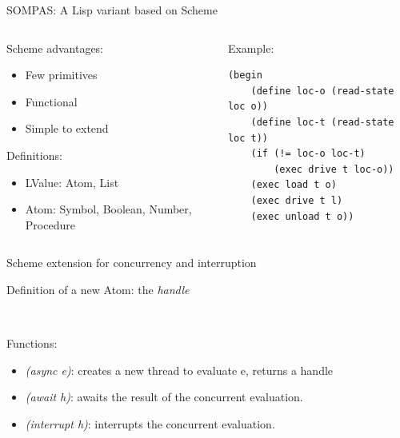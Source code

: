 \begin{frame}[fragile]{SOMPAS: A Lisp variant based on Scheme}
    \begin{columns}[t]

        \begin{column}{0.4\textwidth}
            Scheme advantages:
            \begin{itemize}
                \item Few primitives
                \item Functional
                \item Simple to extend
            \end{itemize}
            Definitions:
            \begin{itemize}
                \item LValue: Atom, List
                \item Atom: Symbol, Boolean, Number, Procedure
            \end{itemize}
        \end{column}
        \begin{column}{0.6\textwidth}
            Example:
                        \lstset{columns=fullflexible}
                        \begin{lstlisting}
(begin
    (define loc-o (read-state loc o))
    (define loc-t (read-state loc t))
    (if (!= loc-o loc-t)
        (exec drive t loc-o))
    (exec load t o) 
    (exec drive t l)
    (exec unload t o))             
                        \end{lstlisting}
                    \end{column}
     \end{columns}

\end{frame}

\begin{frame}{Scheme extension for concurrency and interruption}

    Definition of a new Atom: the \emph{handle}
    
    ~~

    Functions:
    \begin{itemize}
        \item \textit{(async e)}: creates a new thread to evaluate e, returns a handle
        \item \textit{(await h)}: awaits the result of the concurrent evaluation.
        \item \textit{(interrupt h)}: interrupts the concurrent evaluation.
    \end{itemize}
\end{frame}


